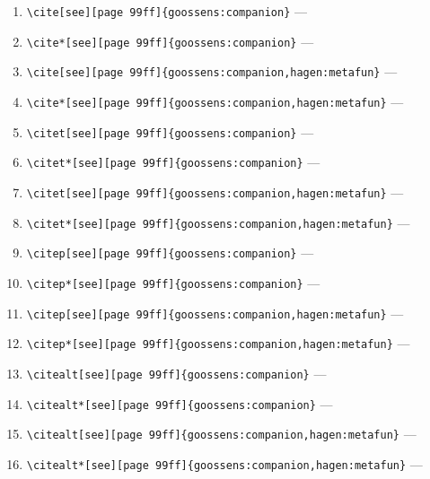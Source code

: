 \documentclass[12pt]{article}
\begin{document}
\begin{enumerate}
\item
\verb|\cite[see][page 99ff]{goossens:companion}| --- 
\cite[see][page 99ff]{goossens:companion}
\item
\verb|\cite*[see][page 99ff]{goossens:companion}| --- 
\cite*[see][page 99ff]{goossens:companion}
\item
\verb|\cite[see][page 99ff]{goossens:companion,hagen:metafun}| --- 
\cite[see][page 99ff]{goossens:companion,hagen:metafun}
\item
\verb|\cite*[see][page 99ff]{goossens:companion,hagen:metafun}| --- 
\cite*[see][page 99ff]{goossens:companion,hagen:metafun}
\item
\verb|\citet[see][page 99ff]{goossens:companion}| --- 
\citet[see][page 99ff]{goossens:companion}
\item
\verb|\citet*[see][page 99ff]{goossens:companion}| --- 
\citet*[see][page 99ff]{goossens:companion}
\item
\verb|\citet[see][page 99ff]{goossens:companion,hagen:metafun}| --- 
\citet[see][page 99ff]{goossens:companion,hagen:metafun}
\item
\verb|\citet*[see][page 99ff]{goossens:companion,hagen:metafun}| --- 
\citet*[see][page 99ff]{goossens:companion,hagen:metafun}
\item
\verb|\citep[see][page 99ff]{goossens:companion}| --- 
\citep[see][page 99ff]{goossens:companion}
\item
\verb|\citep*[see][page 99ff]{goossens:companion}| --- 
\citep*[see][page 99ff]{goossens:companion}
\item
\verb|\citep[see][page 99ff]{goossens:companion,hagen:metafun}| --- 
\citep[see][page 99ff]{goossens:companion,hagen:metafun}
\item
\verb|\citep*[see][page 99ff]{goossens:companion,hagen:metafun}| --- 
\citep*[see][page 99ff]{goossens:companion,hagen:metafun}
\item
\verb|\citealt[see][page 99ff]{goossens:companion}| --- 
\citealt[see][page 99ff]{goossens:companion}
\item
\verb|\citealt*[see][page 99ff]{goossens:companion}| --- 
\citealt*[see][page 99ff]{goossens:companion}
\item
\verb|\citealt[see][page 99ff]{goossens:companion,hagen:metafun}| --- 
\citealt[see][page 99ff]{goossens:companion,hagen:metafun}
\item
\verb|\citealt*[see][page 99ff]{goossens:companion,hagen:metafun}| --- 
\citealt*[see][page 99ff]{goossens:companion,hagen:metafun}

\end{enumerate}
\end{document}
